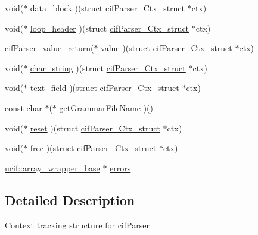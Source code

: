 \begin{DoxyCompactItemize}
\item 
void($\ast$ \hyperlink{structcif_parser___ctx__struct_a2bf6a8d971f11d6b7bbcfc89c473bac4}{data\-\_\-block} )(struct \hyperlink{structcif_parser___ctx__struct}{cif\-Parser\-\_\-\-Ctx\-\_\-struct} $\ast$ctx)
\item 
void($\ast$ \hyperlink{structcif_parser___ctx__struct_a3ed187c354e3aa3db97944af3cec4992}{loop\-\_\-header} )(struct \hyperlink{structcif_parser___ctx__struct}{cif\-Parser\-\_\-\-Ctx\-\_\-struct} $\ast$ctx)
\item 
\hyperlink{cif_parser_8h_a0858fbea130868e3c9f21bcf216a9709}{cif\-Parser\-\_\-value\-\_\-return}($\ast$ \hyperlink{structcif_parser___ctx__struct_ac0beb0988bb13922d4ebc6ebe34204e7}{value} )(struct \hyperlink{structcif_parser___ctx__struct}{cif\-Parser\-\_\-\-Ctx\-\_\-struct} $\ast$ctx)
\item 
void($\ast$ \hyperlink{structcif_parser___ctx__struct_a2aedf389a1f5aa4c2800cf6e45303aab}{char\-\_\-string} )(struct \hyperlink{structcif_parser___ctx__struct}{cif\-Parser\-\_\-\-Ctx\-\_\-struct} $\ast$ctx)
\item 
void($\ast$ \hyperlink{structcif_parser___ctx__struct_a1fd07a6c68e36136eb0c0e5ab2e02f74}{text\-\_\-field} )(struct \hyperlink{structcif_parser___ctx__struct}{cif\-Parser\-\_\-\-Ctx\-\_\-struct} $\ast$ctx)
\item 
const char $\ast$($\ast$ \hyperlink{structcif_parser___ctx__struct_aefeaa34c1d9c9f571296690ca3a9b8a8}{get\-Grammar\-File\-Name} )()
\item 
void($\ast$ \hyperlink{structcif_parser___ctx__struct_affe2b6f7d8b3c2c9272b03f2df894302}{reset} )(struct \hyperlink{structcif_parser___ctx__struct}{cif\-Parser\-\_\-\-Ctx\-\_\-struct} $\ast$ctx)
\item 
void($\ast$ \hyperlink{structcif_parser___ctx__struct_adbb9ccde473caa5084de42bf8a74d52f}{free} )(struct \hyperlink{structcif_parser___ctx__struct}{cif\-Parser\-\_\-\-Ctx\-\_\-struct} $\ast$ctx)
\item 
\hyperlink{structucif_1_1array__wrapper__base}{ucif\-::array\-\_\-wrapper\-\_\-base} $\ast$ \hyperlink{structcif_parser___ctx__struct_ac901a5e77c67a7371bcdb7949f3c8259}{errors}
\end{DoxyCompactItemize}


\subsection{Detailed Description}
Context tracking structure for cif\-Parser 

